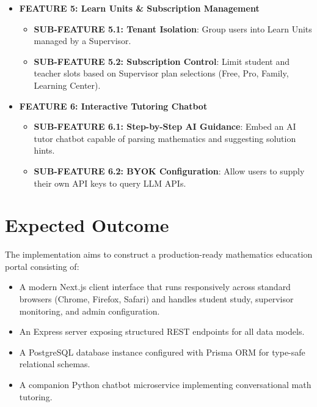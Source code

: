 \begin{itemize}
    \item \textbf{FEATURE 5: Learn Units \& Subscription Management}
    \begin{itemize}
        \item \textbf{SUB-FEATURE 5.1: Tenant Isolation}: Group users into Learn Units managed by a Supervisor.
        \item \textbf{SUB-FEATURE 5.2: Subscription Control}: Limit student and teacher slots based on Supervisor plan selections (Free, Pro, Family, Learning Center).
    \end{itemize}

    \item \textbf{FEATURE 6: Interactive Tutoring Chatbot}
    \begin{itemize}
        \item \textbf{SUB-FEATURE 6.1: Step-by-Step AI Guidance}: Embed an AI tutor chatbot capable of parsing mathematics and suggesting solution hints.
        \item \textbf{SUB-FEATURE 6.2: BYOK Configuration}: Allow users to supply their own API keys to query LLM APIs.
    \end{itemize}
\end{itemize}

\section{Expected Outcome}

The implementation aims to construct a production-ready mathematics education portal consisting of:
\begin{itemize}
    \item A modern Next.js client interface that runs responsively across standard browsers (Chrome, Firefox, Safari) and handles student study, supervisor monitoring, and admin configuration.
    \item An Express server exposing structured REST endpoints for all data models.
    \item A PostgreSQL database instance configured with Prisma ORM for type-safe relational schemas.
    \item A companion Python chatbot microservice implementing conversational math tutoring.
\end{itemize}
